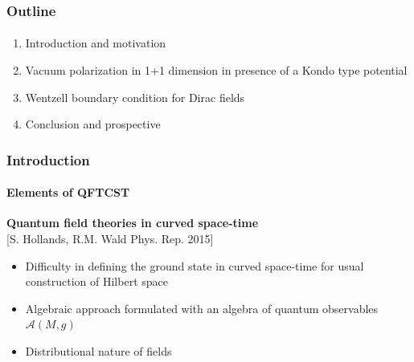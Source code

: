 \documentclass[french]{beamer}
\begin{document}
\begin{frame}
\frametitle{Outline}
\framesubtitle{}
\begin{enumerate}
\item Introduction and motivation
 \item Vacuum polarization in 1+1 dimension in presence of a Kondo type potential
 \item Wentzell boundary condition for Dirac fields
 \item Conclusion and prospective
\end{enumerate}

\end{frame}

\begin{frame}
\frametitle{Introduction}
\framesubtitle{Elements of QFTCST}

\textbf{Quantum field theories in curved space-time}
\\
\tiny\color{blue}[S. Hollands, R.M. Wald Phys. Rep. 2015]\color{black}\normalsize

\begin{itemize}

\item Difficulty in defining the ground state in curved space-time for usual construction of Hilbert space
\item Algebraic approach formulated with an algebra of quantum observables $\mathscr{A}(M,g)$
\item Distributional nature of fields
%
%
%
\end{itemize}

\end{frame}
\end{document}
